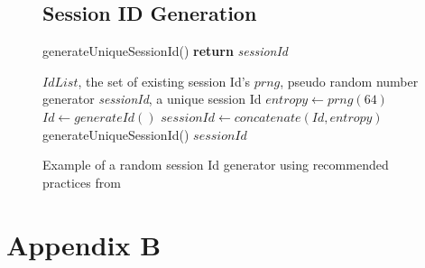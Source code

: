 \documentclass{ueacmpstyle}
\begin{document}
            \begin{figure}[ht]
              \subsection{Session ID Generation}
              \label{sec:session-id-gen}
              \centering
              \begin{algorithm}[H]
              \caption{generateUniqueSessionId() {\bf return} \emph{sessionId}}
                    \begin{algorithmic}[1]
                        \Require $IdList$, the set of existing session Id's
                        \Require $prng$, pseudo random number generator
                        \Ensure \emph{sessionId}, a unique session Id
                        \State $entropy \leftarrow prng(64)$
                        \State $Id \leftarrow generateId()$
                        \State $sessionId \leftarrow concatenate(Id, entropy)$
                          \State generateUniqueSessionId()
                        \EndIf
                        \State \Return $sessionId$
                    \end{algorithmic}
              \end{algorithm}
              \caption{Example of a random session Id generator using recommended practices 
                       from \cite{OWASPSessionManagement}}
              \label{fig:session-id-gen}
          \end{figure}

        \section{Appendix B}\label{app:B}
\end{document}
